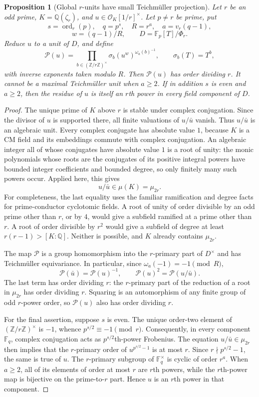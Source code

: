 \documentclass[11pt]{article}
\newcommand{\ord}{\operatorname{ord}}
\newtheorem{proposition}[theorem]{Proposition}
\theoremstyle{definition}
\theoremstyle{remark}
\begin{document}
\begin{proposition}[Global $r$-units have small Teichm\"uller projection]
\label{prop:global-unit-teich-barrier}
Let $r$ be an odd prime, $K=\mathbb Q(\zeta_r)$, and
$u\in\mathcal O_K[1/r]^\times$.
Let $p\ne r$ be prime, put
\[
 s=\ord_r(p),\quad q=p^s,\quad R=r^a,\quad
 a=v_r(q-1),
\]
\[
 w=(q-1)/R,\qquad D=\mathbb F_p[T]/\Phi_r.
\]
Reduce $u$ to a unit of $D$, and define
\[
 \mathcal P(u)=
 \prod_{b\in(\mathbb Z/r\mathbb Z)^\times}
 \sigma_b(u^w)^{\omega_a(b)^{-1}},
 \qquad \sigma_b(T)=T^b,
\]
with inverse exponents taken modulo $R$.
Then $\mathcal P(u)$ has order dividing $r$.
It cannot be a maximal Teichm\"uller unit when $a\ge2$.
If in addition $s$ is even and $a\ge2$, then the residue of $u$
is itself an $r$th power in every field component of $D$.
\end{proposition}

\begin{proof}
The unique prime of $K$ above $r$ is stable under complex
conjugation. Since the divisor of $u$ is supported there, all
finite valuations of $u/\bar u$ vanish. Thus $u/\bar u$ is an
algebraic unit. Every complex conjugate has absolute value $1$,
because $K$ is a CM field and its embeddings commute with
complex conjugation.
An algebraic integer all of whose conjugates have absolute
value $1$ is a root of unity: the monic polynomials whose roots
are the conjugates of its positive integral powers have bounded
integer coefficients and bounded degree, so only finitely many
such powers occur. Applied here, this gives
\[
 u/\bar u\in\mu(K)=\mu_{2r}.
\]
For completeness, the last equality uses the familiar ramification
and degree facts for prime-conductor cyclotomic fields.
A root of unity of order divisible by an odd prime other than
$r$, or by $4$, would give a subfield ramified at a prime other
than $r$. A root of order divisible by $r^2$ would give a
subfield of degree at least $r(r-1)>[K:\mathbb Q]$.
Neither is possible, and $K$ already contains $\mu_{2r}$.

The map $\mathcal P$ is a group homomorphism into the
$r$-primary part of $D^\times$ and has Teichm\"uller
equivariance. In particular, since
$\omega_a(-1)=-1\pmod R$,
\[
 \mathcal P(\bar u)=\mathcal P(u)^{-1},\qquad
 \mathcal P(u)^2=\mathcal P(u/\bar u).
\]
The last term has order dividing $r$: the $r$-primary part of
the reduction of a root in $\mu_{2r}$ has order dividing $r$.
Squaring is an automorphism of any finite group of odd
$r$-power order, so $\mathcal P(u)$ also has order dividing $r$.

For the final assertion, suppose $s$ is even.
The unique order-two element of
$(\mathbb Z/r\mathbb Z)^\times$ is $-1$, whence
$p^{s/2}\equiv-1\pmod r$.
Consequently, in every component $\mathbb F_q$,
complex conjugation acts as $p^{s/2}$th-power Frobenius.
The equation $u/\bar u\in\mu_{2r}$ then implies that the
$r$-primary order of
$u^{p^{s/2}-1}$ is at most $r$.
Since $r\nmid p^{s/2}-1$, the same is true of $u$.
The $r$-primary subgroup of $\mathbb F_q^\times$ is cyclic of
order $r^a$. When $a\ge2$, all of its elements of order at most
$r$ are $r$th powers, while the $r$th-power map is bijective on
the prime-to-$r$ part. Hence $u$ is an $r$th power in that
component.
\end{proof}
\end{document}
